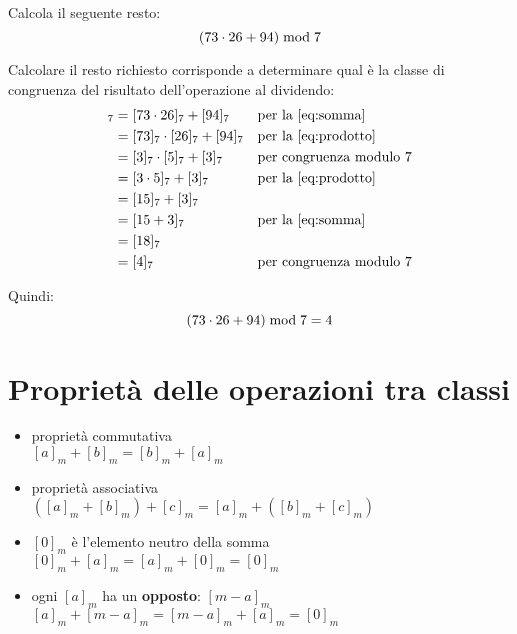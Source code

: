 \begin{esercizio}
    Calcola il seguente resto:
    \begin{equation*}
        (73 \cdot 26 + 94)  \bmod  7
    \end{equation*}

    Calcolare il resto richiesto corrisponde a determinare qual è la classe di congruenza del risultato dell'operazione al dividendo:
    \begin{align*}
        [73 \cdot 26 + 94]_7 &= [73 \cdot 26]_7 + [94]_7 &&\text{per la~\eqref{eq:somma}} \\
        &= [73]_7 \cdot [26]_7 + [94]_7 &&\text{per la~\eqref{eq:prodotto}} \\
        &= [3]_7 \cdot [5]_7 + [3]_7 &&\text{per congruenza modulo 7} \\
        &= [3 \cdot 5]_7 + [3]_7 &&\text{per la~\eqref{eq:prodotto}} \\
        &= [15]_7 + [3]_7 \\
        &= [15 + 3]_7 &&\text{per la~\eqref{eq:somma}} \\
        &= [18]_7 \\
        &= [4]_7 &&\text{per congruenza modulo 7}
    \end{align*}

    Quindi:
    \begin{equation*}
        (73 \cdot 26 + 94)  \bmod  7 = 4
    \end{equation*}
\end{esercizio}

\section{Proprietà delle operazioni tra classi}
\label{sec:proprieta_operazioni_classi}

\begin{teorema}
    \begin{itemize}
        \item proprietà commutativa \\ $[a]_m + [b]_m = [b]_m + [a]_m$
        \item proprietà associativa \\ $([a]_m + [b]_m) + [c]_m = [a]_m + ([b]_m + [c]_m)$
        \item $[0]_m$ è l'elemento neutro della somma \\ $[0]_m + [a]_m = [a]_m + [0]_m = [0]_m$
        \item ogni $[a]_m$ ha un \textbf{opposto}: $[m-a]_m$ \\ $[a]_m + [m-a]_m = [m-a]_m + [a]_m = [0]_m$
    \end{itemize}
\end{teorema}

